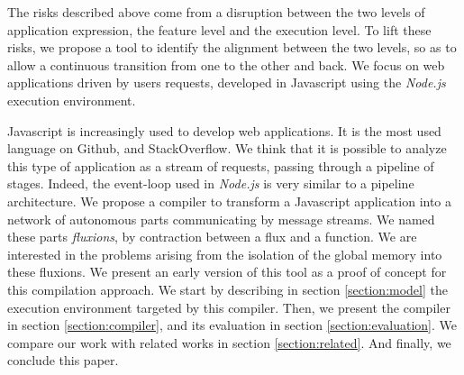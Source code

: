The risks described above come from a disruption between the two levels of application expression, the feature level and the execution level.
To lift these risks, we propose a tool to identify the alignment between the two levels, so as to allow a continuous transition from one to the other and back.
We focus on web applications driven by users requests, developed in Javascript using the \textit{Node.js} execution environment.

Javascript is increasingly used to develop web applications.
It is the most used language on Github, and StackOverflow.
We think that it is possible to analyze this type of application as a stream of requests, passing through a pipeline of stages.
Indeed, the event-loop used in \textit{Node.js} is very similar to a pipeline architecture.
We propose a compiler to transform a Javascript application into a network of autonomous parts communicating by message streams.
We named these parts \textit{fluxions}, by contraction between a flux and a function.
We are interested in the problems arising from the isolation of the global memory into these fluxions.
We present an early version of this tool as a proof of concept for this compilation approach.
We start by describing in section \ref{section:model} the execution environment targeted by this compiler.
Then, we present the compiler in section \ref{section:compiler}, and its evaluation in section \ref{section:evaluation}.
We compare our work with related works in section \ref{section:related}.
And finally, we conclude this paper.